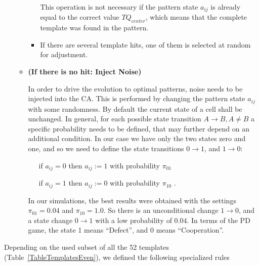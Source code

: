 \documentclass[10pt,a4paper]{article}  %
\begin{document}
\begin{itemize}
\begin{itemize}
\begin{itemize}
               This operation is not necessary if
              the  pattern state  $a_{ij}$ is already equal to the correct value  $\textit{TQ}_{center}$,
               which means that the complete template was found in the pattern.
              
              \item
              If there are several template hits, one of them is selected at random for adjustment. 
            
            \end{itemize}
            
            
      \item \textbf{(If there is no hit: Inject Noise)}
      
			In order to drive the evolution to optimal patterns, noise needs to be injected
			into the CA.
			This is performed by changing the pattern state $a_{ij}$ with some randomness.
			By default the current state of a cell shall be unchanged. 
			In general, for each possible state transition $A \rightarrow B, A\neq B$ 
			a specific probability needs to be defined, that may further depend
			on an additional condition. In our case we have only the two states
			zero and one, and so we need to define the state transitions 
			$0 \rightarrow 1$, and $1 \rightarrow 0$:
			
			 
        ~~~if $a_{ij}=0$ then  $a_{ij}:=1$ with probability $\pi_{01}$
        
        ~~~if $a_{ij}=1$ then  $a_{ij}:=0$ with probability $\pi_{10}$	.
			
			In our simulations, the best results were obtained with the settings
			 $\pi_{01}=0.04$ and $\pi_{10}=1.0$.
			So there is an unconditional change $1\rightarrow 0$, and
			a state change $0\rightarrow 1$ with a low probability of $0.04$.
			In terms of the PD game, the state 1 means ``Defect'', and 0 means ``Cooperation''. 
      
    \end{itemize}

  
\end{itemize}
      

Depending on the used subset of all the 52 templates (Table~\ref{TableTemplatesEven}), 
we defined the following specialized rules
\end{document}
